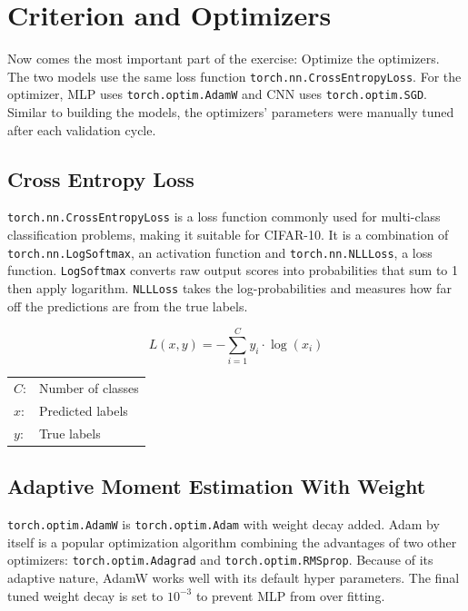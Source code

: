 \documentclass{report}
\begin{document}
\section{Criterion and Optimizers}
Now comes the most important part of the exercise: Optimize the optimizers. The two models use the same loss 
function \texttt{torch.nn.CrossEntropyLoss}. For the optimizer, MLP uses \texttt{torch.optim.AdamW} and CNN 
uses \texttt{torch.optim.SGD}. Similar to building the models, the optimizers' parameters were manually 
tuned after each validation cycle.

\subsection{Cross Entropy Loss}
\texttt{torch.nn.CrossEntropyLoss} is a loss function commonly used for multi-class classification problems, making 
it suitable for CIFAR-10. It is a combination of \texttt{torch.nn.LogSoftmax}, an activation function and 
\texttt{torch.nn.NLLLoss}, a loss function. \texttt{LogSoftmax} converts raw output scores into probabilities that sum to 
1 then apply logarithm. \texttt{NLLLoss} takes the log-probabilities and measures how far off the predictions are from 
the true labels. 

\[ L(x, y) = - \sum_{i=1}^{C} y_i \cdot \log(x_i) \]

\begin{center}
    \begin{tabular}{ll}
        $C$: & Number of classes  \\    
        $x$: & Predicted labels   \\
        $y$: & True labels        \\
    \end{tabular}
\end{center}

\subsection{Adaptive Moment Estimation With Weight}
\texttt{torch.optim.AdamW} is \texttt{torch.optim.Adam} with weight decay added. Adam by itself is a popular optimization 
algorithm combining the advantages of two other optimizers: \texttt{torch.optim.Adagrad} and \texttt{torch.optim.RMSprop}. 
Because of its adaptive nature, AdamW works well with its default hyper parameters. The final tuned weight decay is set to 
$10^{-3}$ to prevent MLP from over fitting.
\end{document}
